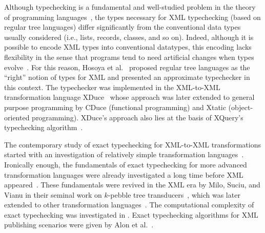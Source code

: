 \documentclass[twoside,leqno,onecolumn,pdftex]{article}
\begin{document}
\begin{historicalBG}
  Although typechecking is a fundamental and well-studied problem in
  the theory of programming languages~\cite{pierce:types-proglang},
  the types necessary for XML typechecking (based on regular tree
  languages) differ significantly from the conventional data types
  usually considered (i.e., lists, records, classes, and so on).
  Indeed, although it is possible to encode XML types into
  conventional datatypes, this encoding lacks flexibility in the sense
  that programs tend to need artificial changes when types
  evolve~\cite{HVPRegtypeToplas}. For this reason, Hosoya et
  al.~\cite{HVPRegtypeToplas} proposed regular tree languages as the
  ``right'' notion of types for XML and presented an approximate
  typechecker in this context. The typechecker was implemented in the
  XML-to-XML transformation language XDuce~\cite{HosoyaPierceTOIT03}
  whose approach was later extended to general purpose programming by
  CDuce (functional programming) and Xtatic (object-oriented
  programming). XDuce's approach also lies at the basis of XQuery's
  typechecking algorithm~\cite{XQuery}.

  The contemporary study of exact typechecking for XML-to-XML
  transformations started with an investigation of relatively simple
  transformation
  languages~\cite{Milo:PODS99,Murata97,PapakonstantinouVianu00}.
  Ironically enough, the fundamentals of exact typechecking for more
  advanced transformation languages were already investigated a long
  time before XML appeared~\cite{Engelfriet77,Engelfriet85}.  These
  fundamentals were revived in the XML era by Milo, Suciu, and Vianu
  in their seminal work on $k$-pebble tree
  transducers~\cite{DBLP:journals/jcss/MiloSV03}, which was later
  extended to other transformation
  languages~\cite{Tozawa01,Maneth05,Tozawa06}.  The computational
  complexity of exact typechecking was investigated in
  \cite{DBLP:journals/jcss/MartensN07,Maneth07,FrischHosoya07}. Exact
  typechecking algorithms for XML publishing scenarios were given by
  Alon et al.~\cite{DBLP:journals/tocl/AlonMNSV03}.

\end{historicalBG}
~\\\\
\end{document}
